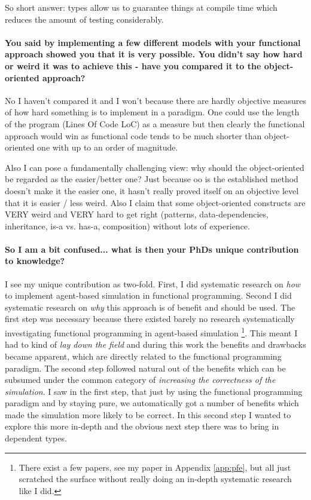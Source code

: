 So short answer: types allow us to guarantee things at compile time which reduces the amount of testing considerably.

\paragraph{You said by implementing a few different models with your functional approach showed you that it is very possible. You didn't say how hard or weird it was to achieve this - have you compared it to the object-oriented approach?}
No I haven't compared it and I won't because there are hardly objective measures of how hard something is to implement in a paradigm. One could use the length of the program (Lines Of Code LoC) as a measure but then clearly the functional approach would win as functional code tends to be much shorter than object-oriented one with up to an order of magnitude.

Also I can pose a fundamentally challenging view: why should the object-oriented be regarded as the easier/better one? Just because oo is the established method doesn't make it the easier one, it hasn't really proved itself on an objective level that it is easier / less weird. Also I claim that some object-oriented constructs are VERY weird and VERY hard to get right (patterns, data-dependencies, inheritance, is-a vs. has-a, composition) without lots of experience.

\paragraph{So I am a bit confused... what is then your PhDs unique contribution to knowledge?}
I see my unique contribution as two-fold. First, I did systematic research on \textit{how} to implement agent-based simulation in functional programming. Second I did systematic research on \textit{why} this approach is of benefit and should be used. The first step was necessary because there existed barely no research systematically investigating functional programming in agent-based simulation \footnote{There exist a few papers, see my paper in Appendix \ref{app:pfe}, but all just scratched the surface without really doing an in-depth systematic research like I did.}. This meant I had to kind of \textit{lay down the field} and during this work the benefits and drawbacks became apparent, which are directly related to the functional programming paradigm. 
The second step followed natural out of the benefits which can be subsumed under the common category of \textit{increasing the correctness of the simulation}. I saw in the first step, that just by using the functional programming paradigm and by staying pure, we automatically got a number of benefits which made the simulation more likely to be correct. In this second step I wanted to explore this more in-depth and the obvious next step there was to bring in dependent types. 

